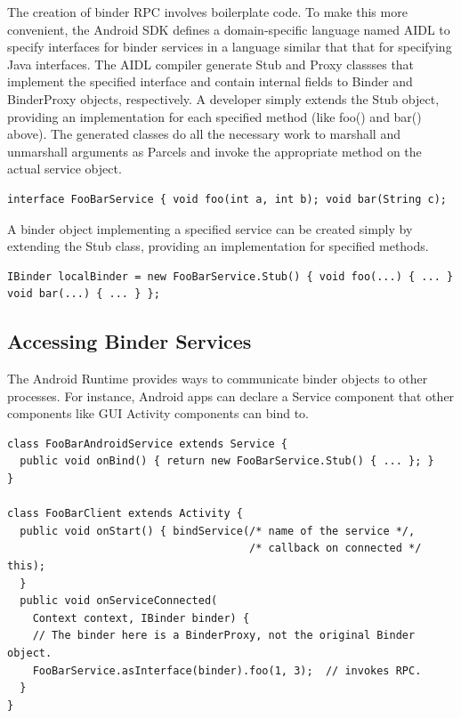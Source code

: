 \documentclass[prodmode]{acmlarge}
\begin{document}

The creation of binder RPC involves boilerplate code. To make this more convenient, the Android SDK defines a domain-specific language named AIDL to specify interfaces for binder services in a language similar that that for specifying Java interfaces. The AIDL compiler generate Stub and Proxy classses that implement the specified interface and contain internal fields to Binder and BinderProxy objects, respectively. A developer simply extends the Stub object, providing an implementation for each specified method (like foo() and bar() above). The generated classes do all the necessary work to marshall and unmarshall arguments as Parcels and invoke the appropriate method on the actual service object.

\begin{Verbatim}[samepage=true]
interface FooBarService { void foo(int a, int b); void bar(String c);
\end{Verbatim}

A binder object implementing a specified service can be created simply by extending the Stub class, providing an implementation for specified methods.
\begin{Verbatim}[samepage=true]
IBinder localBinder = new FooBarService.Stub() { void foo(...) { ... } void bar(...) { ... } };
\end{Verbatim}

\subsection{Accessing Binder Services}
The Android Runtime provides ways to communicate binder objects to other processes. For instance, Android apps can declare a Service component that other components like GUI Activity components can bind to.

\begin{Verbatim}[samepage=true]
class FooBarAndroidService extends Service {
  public void onBind() { return new FooBarService.Stub() { ... }; }
}

class FooBarClient extends Activity {
  public void onStart() { bindService(/* name of the service */,
                                      /* callback on connected */ this);
  }
  public void onServiceConnected(
    Context context, IBinder binder) {
    // The binder here is a BinderProxy, not the original Binder object.
    FooBarService.asInterface(binder).foo(1, 3);  // invokes RPC.
  }
}
\end{Verbatim}
\end{document}
